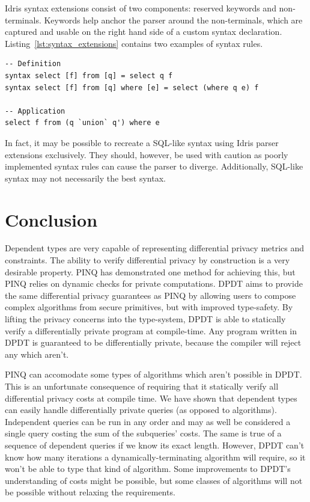 \documentclass[12pt]{article}
\begin{document}
Idris syntax extensions consist of two components: reserved keywords and non-terminals.
Keywords help anchor the parser around the non-terminals, which are captured and usable on the right hand side of a custom syntax declaration.
Listing~\ref{lst:syntax_extensions} contains two examples of syntax rules.

\begin{lstlisting}[caption={Extending Idris' syntax},label={lst:syntax_extensions}]
-- Definition
syntax select [f] from [q] = select q f
syntax select [f] from [q] where [e] = select (where q e) f

-- Application
select f from (q `union` q') where e
\end{lstlisting}

In fact, it may be possible to recreate a SQL-like syntax using Idris parser extensions exclusively.
They should, however, be used with caution as poorly implemented syntax rules can cause the parser to diverge.
Additionally, SQL-like syntax may not necessarily the best syntax.

\section{Conclusion}\label{sec:conclusion}

Dependent types are very capable of representing differential privacy metrics and constraints.
The ability to verify differential privacy by construction is a very desirable property.
PINQ has demonstrated one method for achieving this, but PINQ relies on dynamic checks for private computations.
DPDT aims to provide the same differential privacy guarantees as PINQ by allowing users to compose complex algorithms from secure primitives, but with improved type-safety.
By lifting the privacy concerns into the type-system, DPDT is able to statically verify a differentially private program at compile-time.
Any program written in DPDT is guaranteed to be differentially private, because the compiler will reject any which aren't.

PINQ can accomodate some types of algorithms which aren't possible in DPDT.
This is an unfortunate consequence of requiring that it statically verify all differential privacy costs at compile time.
We have shown that dependent types can easily handle differentially private queries (as opposed to algorithms).
Independent queries can be run in any order and may as well be considered a single query costing the sum of the subqueries' costs.
The same is true of a sequence of dependent queries if we know its exact length.
However, DPDT can't know how many iterations a dynamically-terminating algorithm will require, so it won't be able to type that kind of algorithm.
Some improvements to DPDT's understanding of costs might be possible, but some classes of algorithms will not be possible without relaxing the requirements.
\end{document}
